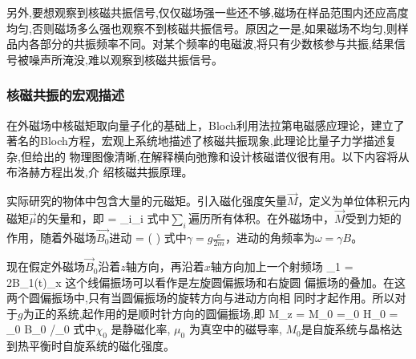 \documentclass{ctexart}
\begin{document}
另外,要想观察到核磁共振信号,仅仅磁场强一些还不够,磁场在样品范围内还应高度
均匀,否则磁场多么强也观察不到核磁共振信号。原因之一是,如果磁场不均匀,则样品内各部分的共振频率不同。对某个频率的电磁波,将只有少数核参与共振,结果信号被噪声所淹没,难以观察到核磁共振信号。

\subsubsection{核磁共振的宏观描述}
在外磁场中核磁矩取向量子化的基础上，Bloch利用法拉第电磁感应理论，建立了著名的Bloch方程，宏观上系统地描述了核磁共振现象,此理论比量子力学描述复杂,但给出的
物理图像清晰,在解释横向弛豫和设计核磁谱仪很有用。以下内容将从布洛赫方程出发,介
绍核磁共振原理。

实际研究的物体中包含大量的元磁矩。引入磁化强度矢量$\vec{M}$，定义为单位体积元内磁矩$\vec{\mu}$的矢量和，即
\beq
{} = \sum_i\mu_i
\eeq
式中$\sum_i$遍历所有体积。在外磁场中，$\vec{M}$受到力矩的作用，随着外磁场$\vec{B_0}$进动
\beq
{} = \gamma\cdot \left( \times {}\right)
\eeq
式中$\gamma = g\frac{e}{2m}$，进动的角频率为$\omega = \gamma B$。

现在假定外磁场$\vec{B}_0$沿着$z$轴方向，再沿着$x$轴方向加上一个射频场
\beq
{}_1 = 2B_1\cos(\omega t)_x
\eeq
这个线偏振场可以看作是左旋圆偏振场和右旋圆
偏振场的叠加。在这两个圆偏振场中,只有当圆偏振场的旋转方向与进动方向相
同时才起作用。所以对于$g$为正的系统,起作用的是顺时针方向的圆偏振场,即
\beq
M_z = M_0 =\chi_0 H_0 = \chi_0 B_0 /\mu_0
\eeq
式中$\chi_0$ 是静磁化率, $\mu_0$ 为真空中的磁导率, $M_0$是自旋系统与晶格达到热平衡时自旋系统的磁化强度。
\end{document}
